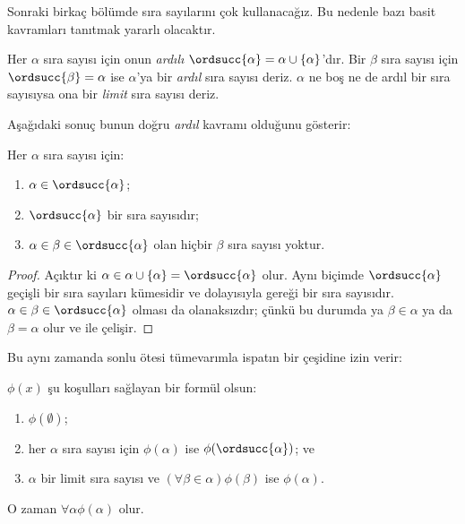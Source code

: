 


Sonraki birkaç bölümde sıra sayılarını çok kullanacağız. Bu nedenle bazı
basit kavramları tanıtmak yararlı olacaktır.

\begin{defn}
Her $\alpha$ sıra sayısı için onun \emph{ardılı}
$\ordsucc{\alpha}=\alpha\cup\{\alpha\}$'dır. Bir $\beta$ sıra sayısı için
$\ordsucc{\beta}=\alpha$ ise $\alpha$'ya bir \emph{ardıl} sıra sayısı
deriz. $\alpha$ ne boş ne de ardıl bir sıra sayısıysa ona bir \emph{limit}
sıra sayısı deriz.
\end{defn}
\noindent
Aşağıdaki sonuç bunun doğru \emph{ardıl} kavramı olduğunu gösterir:

\begin{prop}
Her $\alpha$ sıra sayısı için:
\begin{enumerate}
	\item $\alpha \in \ordsucc{\alpha}$;
	\item $\ordsucc{\alpha}$ bir sıra sayısıdır;
	\item $\alpha \in \beta \in \ordsucc{\alpha}$ olan hiçbir $\beta$
	sıra sayısı yoktur.
	\end{enumerate}
\end{prop}

\begin{proof}
Açıktır ki $\alpha\in\alpha\cup\{\alpha\}=\ordsucc{\alpha}$ olur.
Aynı biçimde $\ordsucc{\alpha}$ geçişli bir sıra sayıları kümesidir ve
dolayısıyla  gereği bir sıra sayısıdır.
$\alpha\in\beta\in\ordsucc{\alpha}$ olması da olanaksızdır; çünkü bu
durumda ya $\beta\in\alpha$ ya da $\beta=\alpha$ olur ve
 ile çelişir.
\end{proof}
\noindent
Bu aynı zamanda sonlu ötesi tümevarımla ispatın bir çeşidine izin verir:

\begin{thm}
$\phi(x)$ şu koşulları sağlayan bir formül olsun:
\begin{enumerate}
	\item $\phi(\emptyset)$;
	\item her $\alpha$ sıra sayısı için $\phi(\alpha)$ ise
	$\phi(\ordsucc{\alpha})$; ve
	\item $\alpha$ bir limit sıra sayısı ve
	$(\forall\beta\in\alpha)\phi(\beta)$ ise $\phi(\alpha)$.
\end{enumerate}
O zaman $\forall\alpha\phi(\alpha)$ olur.
\end{thm}

